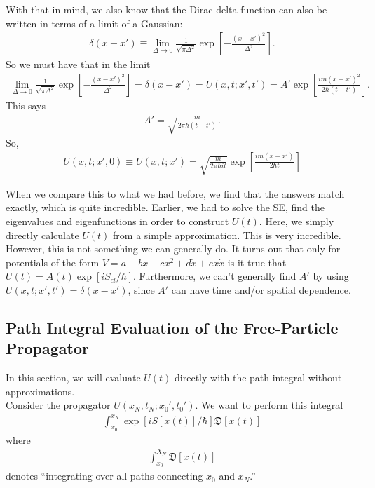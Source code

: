 \documentclass{book}
\theoremstyle{definition}
\newcommand{\f}[2]{\frac{#1}{#2}}
\newcommand{\lb}{\left[}
\newcommand{\rb}{\right]}
\begin{document}
With that in mind, we also know that the Dirac-delta function can also be written in terms of a limit of a Gaussian:
\begin{align}
\delta(x - x') \equiv \lim_{\Delta \to 0} \f{1}{\sqrt{\pi \Delta^2}} \exp\lb -\f{(x-x')^2}{\Delta^2} \rb.
\end{align}
So we must have that in the limit
\begin{align}
\lim_{\Delta \to 0} \f{1}{\sqrt{\pi \Delta^2}} \exp\lb -\f{(x-x')^2}{\Delta^2} \rb = \delta(x-x') = U(x,t;x',t') = A' \exp\lb \f{im(x-x')^2}{2\hbar(t-t')} \rb.
\end{align}
This says
\begin{align}
A' = \sqrt{\f{m}{2\pi \hbar(t-t')}}.
\end{align}
So,
\begin{align}
\boxed{U(x,t; x',0) \equiv U(x,t;x') = \sqrt{\f{m}{2\pi\hbar it}}\exp\lb \f{im(x-x')}{2\hbar t} \rb}
\end{align}

When we compare this to what we had before, we find that the answers match exactly, which is quite incredible. Earlier, we had to solve the SE, find the eigenvalues and eigenfunctions in order to construct $U(t)$. Here, we simply directly calculate $U(t)$ from a simple approximation. This is very incredible.\\

However, this is not something we can generally do. It turns out that only for potentials of the form $V = a + bx + cx^2 + d\dot{x} + ex\dot{x}$ is it true that $U(t) = A(t)\exp[iS_{cl}/\hbar]$. Furthermore, we can't generally find $A'$ by using $U(x,t;x',t') = \delta(x-x')$, since $A'$ can have time and/or spatial dependence. 




\subsection{Path Integral Evaluation of the Free-Particle Propagator}


In this section, we will evaluate $U(t)$ directly with the path integral without approximations. \\

Consider the propagator $U(x_N, t_N; x_0', t_0')$. We want to perform this integral
\begin{align}
\int_{x_0}^{x_N} \exp[iS[x(t)]/\hbar]\mathfrak{D}[x(t)]
\end{align} 
where
\begin{align}
\int_{x_0}^{X_N}\mathfrak{D}[x(t)]
\end{align}
denotes ``integrating over all paths connecting $x_0$ and $x_N$.'' \\
\end{document}
